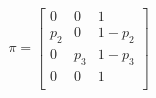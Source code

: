 \documentclass[10pt]{article}
\begin{document}
\[
\pi = 
\left[\begin{array}
{cccc}
0 & 0 & 1 \\
p_{2} & 0 & 1-p_{2} \\
0 & p_{3} & 1-p_{3}\\
0 & 0 & 1 \\
\end{array}\right]
\]
\end{document}

